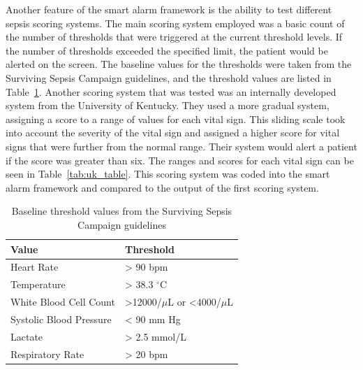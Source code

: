 \documentclass{sig-alternate}
\begin{document}
Another feature of the smart alarm framework is the ability to test different sepsis scoring systems.  The main scoring system employed was a basic count of the number of thresholds that were triggered at the current threshold levels.  If the number of thresholds exceeded the specified limit, the patient would be alerted on the screen.  The baseline values for the thresholds were taken from the Surviving Sepsis Campaign guidelines, and the threshold values are listed in Table~\ref{tab:threshold_table}.  Another scoring system that was tested was an internally developed system from the University of Kentucky.  They used a more gradual system, assigning a score to a range of values for each vital sign.  This sliding scale took into account the severity of the vital sign and assigned a higher score for vital signs that were further from the normal range.  Their system would alert a patient if the score was greater than six.  The ranges and scores for each vital sign can be seen in Table~\ref{tab:uk_table}.  This scoring system was coded into the smart alarm framework and compared to the output of the first scoring system.

\begin{table}
\renewcommand{\arraystretch}{1.5}
  \begin{tabular}{| l | l |}
\hline

{\bf Value} & {\bf Threshold}\\ \hline
Heart Rate & > 90 bpm\\ \hline
Temperature & > 38.3 $^\circ$C\\ \hline
White Blood Cell Count & >12000/$\mu$L  or <4000/$\mu$L\\ \hline
Systolic Blood Pressure & < 90 mm Hg\\ \hline
Lactate & > 2.5 mmol/L\\ \hline
Respiratory Rate & > 20 bpm\\ \hline

 \end{tabular}
	\caption{Baseline threshold values from the Surviving Sepsis Campaign guidelines}
  \label{tab:threshold_table}
\end{table}
\end{document}
